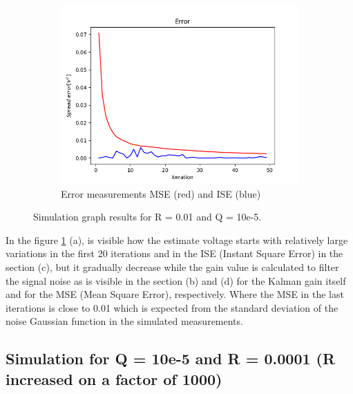 \documentclass{article}
\begin{document}
\begin{figure}[H]
\begin{subfigure} {.5\textwidth}
        \end{subfigure}
        \begin{subfigure}{.5\textwidth}            
            \centering
            \includegraphics[width=0.6\linewidth]{./img/r01q_E.png}
            \caption{Error measurements MSE (red) and ISE (blue)}
        \end{subfigure}
        \caption{Simulation graph results for R = 0.01 and Q = 10e-5.}
        \label{fig:simulation1}
    \end{figure}
    
    In the figure \ref{fig:simulation1} (a), is visible how the estimate voltage starts with relatively
    large variations in the first 20 iterations and in the ISE (Instant Square Error) in the section (c), 
    but it gradually decrease while the gain value is calculated to filter the signal noise as is visible
    in the section (b) and (d) for the Kalman gain itself and for the MSE (Mean Square Error), respectively.
    Where the MSE in the last iterations is close to 0.01 which is expected from the standard deviation of 
    the noise Gaussian function in the simulated measurements.
    
    \subsection{Simulation for Q = 10e-5 and R = 0.0001 (R increased on a factor of 1000)}
\end{document}
